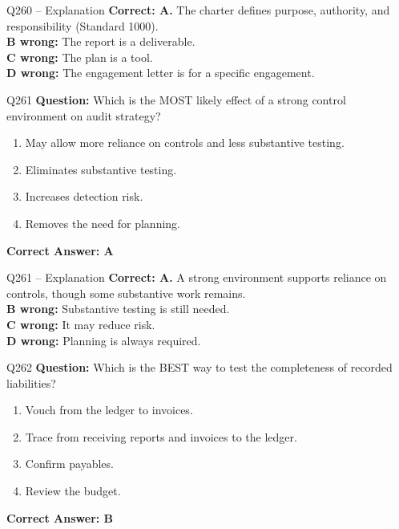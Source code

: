 \documentclass[aspectratio=169,10pt]{beamer}
\begin{document}
	\begin{frame}[t]{Q260 -- Explanation}
		\small
		\textbf{Correct: A.} The charter defines purpose, authority, and responsibility (Standard 1000). \\[4pt]
		\textbf{B wrong:} The report is a deliverable. \\[2pt]
		\textbf{C wrong:} The plan is a tool. \\[2pt]
		\textbf{D wrong:} The engagement letter is for a specific engagement.
	\end{frame}
	
	\begin{frame}[t]{Q261}
		\small
		\textbf{Question:} Which is the MOST likely effect of a strong control environment on audit strategy?
		\begin{enumerate}[label=\Alph*.,itemsep=1pt,topsep=2pt]
			\item May allow more reliance on controls and less substantive testing.
			\item Eliminates substantive testing.
			\item Increases detection risk.
			\item Removes the need for planning.
		\end{enumerate}
		\vspace{4pt}
		\textbf{Correct Answer: A}
	\end{frame}
	
	\begin{frame}[t]{Q261 -- Explanation}
		\small
		\textbf{Correct: A.} A strong environment supports reliance on controls, though some substantive work remains. \\[4pt]
		\textbf{B wrong:} Substantive testing is still needed. \\[2pt]
		\textbf{C wrong:} It may reduce risk. \\[2pt]
		\textbf{D wrong:} Planning is always required.
	\end{frame}
	
	\begin{frame}[t]{Q262}
		\small
		\textbf{Question:} Which is the BEST way to test the completeness of recorded liabilities?
		\begin{enumerate}[label=\Alph*.,itemsep=1pt,topsep=2pt]
			\item Vouch from the ledger to invoices.
			\item Trace from receiving reports and invoices to the ledger.
			\item Confirm payables.
			\item Review the budget.
		\end{enumerate}
		\vspace{4pt}
		\textbf{Correct Answer: B}
	\end{frame}
	
\end{document}

